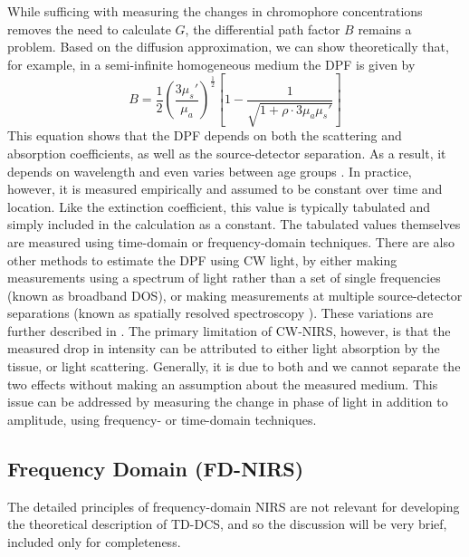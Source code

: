 While sufficing with measuring the changes in chromophore concentrations removes the need to calculate $G$, the differential path factor $B$ remains a problem. Based on the diffusion approximation, we can show theoretically that, for example, in a semi-infinite homogeneous medium the DPF is given by
\begin{equation}
B = \frac{1}{2}\left( \frac{3\mu_s'}{\mu_a} \right)^{\frac{1}{2}}\left[1-\frac{1}{\sqrt{1+\rho\cdot 3\mu_a\mu_s'}}\right]
\end{equation}
This equation shows that the DPF depends on both the scattering and absorption coefficients, as well as the source-detector separation. As a result, it depends on wavelength and even varies between age groups \cite{Scholkmann2013}. In practice, however, it is measured empirically and assumed to be constant over time and location. Like the extinction coefficient, this value is typically tabulated and simply included in the calculation as a constant. The tabulated values themselves are measured using time-domain \cite{Chance1988, Delpy1988} or frequency-domain \cite{Franceschini1999} techniques. There are also other methods to estimate the DPF using CW light, by either making measurements using a spectrum of light rather than a set of single frequencies (known as broadband DOS), or making measurements at multiple source-detector separations (known as spatially resolved spectroscopy \cite[ch. 2.4.2]{Madsen2013}). These variations are further described in \cite{Delpy1997}. The primary limitation of CW-NIRS, however, is that the measured drop in intensity can be attributed to either light absorption by the tissue, or light scattering. Generally, it is due to both and we cannot separate the two effects without making an assumption about the measured medium. This issue can be addressed by measuring the change in phase of light in addition to amplitude, using frequency- or time-domain techniques. 

\subsection{Frequency Domain (FD-NIRS)}
The detailed principles of frequency-domain NIRS are not relevant for developing the theoretical description of TD-DCS, and so the discussion will be very brief, included only for completeness.

